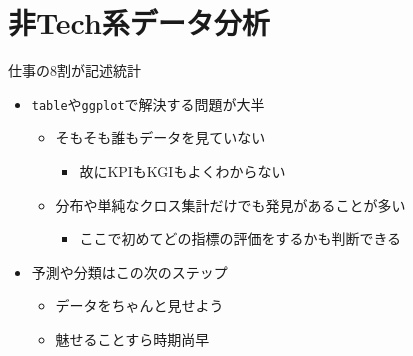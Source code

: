 \documentclass[ignorenonframetext,]{beamer}
\providecommand{\tightlist}{%
  \setlength{\itemsep}{0pt}\setlength{\parskip}{0pt}}
\begin{document}
\hypertarget{tech}{%
\section{非Tech系データ分析}\label{tech}}

\begin{frame}[fragile]{仕事の8割が記述統計}
\protect\hypertarget{8}{}

\begin{itemize}
\tightlist
\item
  \texttt{table}や\texttt{ggplot}で解決する問題が大半

  \begin{itemize}
  \tightlist
  \item
    そもそも誰もデータを見ていない

    \begin{itemize}
    \tightlist
    \item
      故にKPIもKGIもよくわからない
    \end{itemize}
  \item
    分布や単純なクロス集計だけでも発見があることが多い

    \begin{itemize}
    \tightlist
    \item
      ここで初めてどの指標の評価をするかも判断できる
    \end{itemize}
  \end{itemize}
\item
  予測や分類はこの次のステップ

  \begin{itemize}
  \tightlist
  \item
    データをちゃんと見せよう
  \item
    魅せることすら時期尚早
  \end{itemize}
\end{itemize}

\end{frame}
\end{document}
